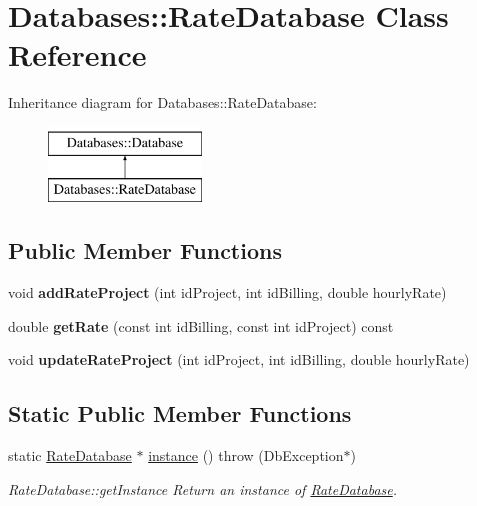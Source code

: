 \hypertarget{classDatabases_1_1RateDatabase}{\section{Databases\-:\-:Rate\-Database Class Reference}
\label{classDatabases_1_1RateDatabase}
}
Inheritance diagram for Databases\-:\-:Rate\-Database\-:\begin{figure}[H]
\begin{center}
\leavevmode
\includegraphics[height=2.000000cm]{d9/d21/classDatabases_1_1RateDatabase}
\end{center}
\end{figure}
\subsection*{Public Member Functions}
\begin{DoxyCompactItemize}
\item 
\hypertarget{classDatabases_1_1RateDatabase_aee32610b164a56b9aaa0a3acddfd8c27}{void {\bfseries add\-Rate\-Project} (int id\-Project, int id\-Billing, double hourly\-Rate)}\label{classDatabases_1_1RateDatabase_aee32610b164a56b9aaa0a3acddfd8c27}

\item 
\hypertarget{classDatabases_1_1RateDatabase_a2d3e0e20c108d335903b17d291fe1a13}{double {\bfseries get\-Rate} (const int id\-Billing, const int id\-Project) const }\label{classDatabases_1_1RateDatabase_a2d3e0e20c108d335903b17d291fe1a13}

\item 
\hypertarget{classDatabases_1_1RateDatabase_a48019f4138b2a3bc3cbd144b1dec6abc}{void {\bfseries update\-Rate\-Project} (int id\-Project, int id\-Billing, double hourly\-Rate)}\label{classDatabases_1_1RateDatabase_a48019f4138b2a3bc3cbd144b1dec6abc}

\end{DoxyCompactItemize}
\subsection*{Static Public Member Functions}
\begin{DoxyCompactItemize}
\item 
static \hyperlink{classDatabases_1_1RateDatabase}{Rate\-Database} $\ast$ \hyperlink{classDatabases_1_1RateDatabase_a9fd72575a2eb189565a0d9eba14121ec}{instance} ()  throw (\-Db\-Exception$\ast$)
\begin{DoxyCompactList}\small\item\em Rate\-Database\-::get\-Instance Return an instance of \hyperlink{classDatabases_1_1RateDatabase}{Rate\-Database}. \end{DoxyCompactList}\end{DoxyCompactItemize}
